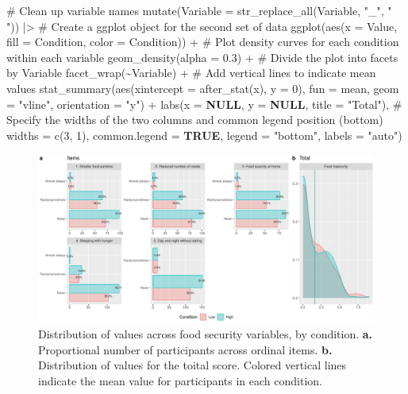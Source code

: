 \documentclass[
  bookmarksnumbered]{article}
\newenvironment{Shaded}{\begin{snugshade}}{\end{snugshade}}
\newcommand{\AttributeTok}[1]{\textcolor[rgb]{0.80,0.80,0.80}{#1}}
\newcommand{\CommentTok}[1]{\textcolor[rgb]{0.50,0.62,0.50}{#1}}
\newcommand{\ConstantTok}[1]{\textcolor[rgb]{0.86,0.64,0.64}{\textbf{#1}}}
\newcommand{\DecValTok}[1]{\textcolor[rgb]{0.86,0.86,0.80}{#1}}
\newcommand{\FloatTok}[1]{\textcolor[rgb]{0.75,0.75,0.82}{#1}}
\newcommand{\FunctionTok}[1]{\textcolor[rgb]{0.94,0.94,0.56}{#1}}
\newcommand{\NormalTok}[1]{\textcolor[rgb]{0.80,0.80,0.80}{#1}}
\newcommand{\SpecialCharTok}[1]{\textcolor[rgb]{0.86,0.64,0.64}{#1}}
\newcommand{\StringTok}[1]{\textcolor[rgb]{0.80,0.58,0.58}{#1}}
\begin{document}
\begin{Shaded}
\begin{Highlighting}[]
    \CommentTok{\# Clean up variable names}
    \FunctionTok{mutate}\NormalTok{(}\AttributeTok{Variable =} \FunctionTok{str\_replace\_all}\NormalTok{(Variable, }\StringTok{"\_"}\NormalTok{, }\StringTok{" "}\NormalTok{)) }\SpecialCharTok{|\textgreater{}}
    \CommentTok{\# Create a ggplot object for the second set of data}
    \FunctionTok{ggplot}\NormalTok{(}\FunctionTok{aes}\NormalTok{(}\AttributeTok{x =}\NormalTok{ Value, }\AttributeTok{fill =}\NormalTok{ Condition, }\AttributeTok{color =}\NormalTok{ Condition)) }\SpecialCharTok{+}
    \CommentTok{\# Plot density curves for each condition within each variable}
    \FunctionTok{geom\_density}\NormalTok{(}\AttributeTok{alpha =} \FloatTok{0.3}\NormalTok{) }\SpecialCharTok{+}
    \CommentTok{\# Divide the plot into facets by Variable}
    \FunctionTok{facet\_wrap}\NormalTok{(}\SpecialCharTok{\textasciitilde{}}\NormalTok{Variable) }\SpecialCharTok{+}
    \CommentTok{\# Add vertical lines to indicate mean values}
    \FunctionTok{stat\_summary}\NormalTok{(}\FunctionTok{aes}\NormalTok{(}\AttributeTok{xintercept =} \FunctionTok{after\_stat}\NormalTok{(x), }\AttributeTok{y =} \DecValTok{0}\NormalTok{),}
      \AttributeTok{fun =}\NormalTok{ mean, }\AttributeTok{geom =} \StringTok{"vline"}\NormalTok{, }\AttributeTok{orientation =} \StringTok{"y"}\NormalTok{) }\SpecialCharTok{+}
    \FunctionTok{labs}\NormalTok{(}\AttributeTok{x =} \ConstantTok{NULL}\NormalTok{, }\AttributeTok{y =} \ConstantTok{NULL}\NormalTok{, }\AttributeTok{title =} \StringTok{"Total"}\NormalTok{),}
  \CommentTok{\# Specify the widths of the two columns and common legend position (bottom)}
  \AttributeTok{widths =} \FunctionTok{c}\NormalTok{(}\DecValTok{3}\NormalTok{, }\DecValTok{1}\NormalTok{),}
  \AttributeTok{common.legend =} \ConstantTok{TRUE}\NormalTok{,}
  \AttributeTok{legend =} \StringTok{"bottom"}\NormalTok{,}
  \AttributeTok{labels =} \StringTok{"auto"}\NormalTok{)}
\end{Highlighting}
\end{Shaded}

\begin{figure}
\centering
\includegraphics{Supplementary_material_files/figure-latex/foodsec-desc-plot-1.pdf}
\caption{\label{fig:foodsec-desc-plot}Distribution of values across food security variables, by condition. \textbf{a.} Proportional number of participants across ordinal items. \textbf{b.} Distribution of values for the toital score. Colored vertical lines indicate the mean value for participants in each condition.}
\end{figure}
\end{document}
